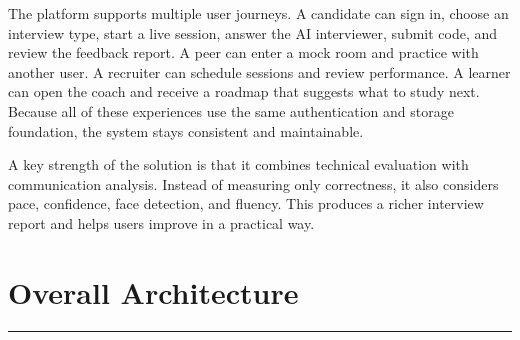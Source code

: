 ﻿\documentclass[12pt,a4paper]{article}
\newcommand{\sectionline}{\vspace{0.4em}\hrule\vspace{0.8em}}
\begin{document}
The platform supports multiple user journeys. A candidate can sign in, choose an interview type, start a live session, answer the AI interviewer, submit code, and review the feedback report. A peer can enter a mock room and practice with another user. A recruiter can schedule sessions and review performance. A learner can open the coach and receive a roadmap that suggests what to study next. Because all of these experiences use the same authentication and storage foundation, the system stays consistent and maintainable.

A key strength of the solution is that it combines technical evaluation with communication analysis. Instead of measuring only correctness, it also considers pace, confidence, face detection, and fluency. This produces a richer interview report and helps users improve in a practical way.

\clearpage

\section{Overall Architecture}
\sectionline
\end{document}
